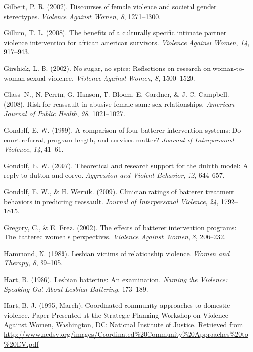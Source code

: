 \documentclass[11pt,]{tufte-book}
\begin{document}
\hypertarget{ref-gilbert2002discourses}{}
Gilbert, P. R. (2002). Discourses of female violence and societal gender
stereotypes. \emph{Violence Against Women}, \emph{8}, 1271--1300.

\hypertarget{ref-gillum2008benefits}{}
Gillum, T. L. (2008). The benefits of a culturally specific intimate
partner violence intervention for african american survivors.
\emph{Violence Against Women}, \emph{14}, 917--943.

\hypertarget{ref-girshick2002no}{}
Girshick, L. B. (2002). No sugar, no spice: Reflections on research on
woman-to-woman sexual violence. \emph{Violence Against Women}, \emph{8},
1500--1520.

\hypertarget{ref-glass2008risk}{}
Glass, N., N. Perrin, G. Hanson, T. Bloom, E. Gardner, \& J. C.
Campbell. (2008). Risk for reassault in abusive female same-sex
relationships. \emph{American Journal of Public Health}, \emph{98},
1021--1027.

\hypertarget{ref-gondolf1999comparison}{}
Gondolf, E. W. (1999). A comparison of four batterer intervention
systems: Do court referral, program length, and services matter?
\emph{Journal of Interpersonal Violence}, \emph{14}, 41--61.

\hypertarget{ref-gondolf2007theoretical}{}
Gondolf, E. W. (2007). Theoretical and research support for the duluth
model: A reply to dutton and corvo. \emph{Aggression and Violent
Behavior}, \emph{12}, 644--657.

\hypertarget{ref-gondolf2009clinician}{}
Gondolf, E. W., \& H. Wernik. (2009). Clinician ratings of batterer
treatment behaviors in predicting reassault. \emph{Journal of
Interpersonal Violence}, \emph{24}, 1792--1815.

\hypertarget{ref-gregory2002effects}{}
Gregory, C., \& E. Erez. (2002). The effects of batterer intervention
programs: The battered women's perspectives. \emph{Violence Against
Women}, \emph{8}, 206--232.

\hypertarget{ref-hammond1989lesbian}{}
Hammond, N. (1989). Lesbian victims of relationship violence.
\emph{Women and Therapy}, \emph{8}, 89--105.

\hypertarget{ref-hart1986lesbian}{}
Hart, B. (1986). Lesbian battering: An examination. \emph{Naming the
Violence: Speaking Out About Lesbian Battering}, 173--189.

\hypertarget{ref-hart1995coordinated}{}
Hart, B. J. (1995, March). Coordinated community approaches to domestic
violence. Paper Presented at the Strategic Planning Workshop on Violence
Against Women, Washington, DC: National Institute of Justice. Retrieved
from
\url{http://www.ncdsv.org/images/Coordinated\%20Community\%20Approaches\%20to\%20DV.pdf}
\end{document}

